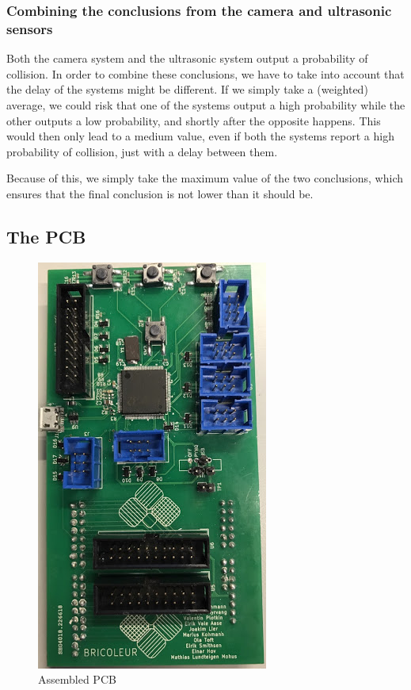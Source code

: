 \subsubsection{Combining the conclusions from the camera and ultrasonic sensors}

Both the camera system and the ultrasonic system output a probability of collision. In order to combine these conclusions, we have to take into account that the delay of the systems might be different. If we simply take a (weighted) average, we could risk that one of the systems output a high probability while the other outputs a low probability, and shortly after the opposite happens. This would then only lead to a medium value, even if both the systems report a high probability of collision, just with a delay between them.

Because of this, we simply take the maximum value of the two conclusions, which ensures that the final conclusion is not lower than it should be.

\subsection{The PCB}

\begin{figure}
    \centering
    \includegraphics[scale=0.4]{Images/PCB_bricoleur.jpg}
    \caption{Assembled PCB}
    \label{fig:pcb}
\end{figure}

